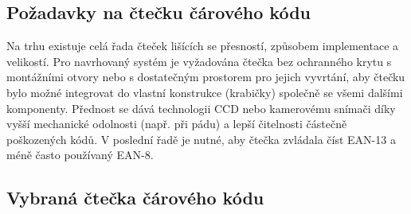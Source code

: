 \subsection{Požadavky na čtečku čárového kódu}
Na trhu existuje celá řada čteček lišících se přesností, způsobem implementace a velikostí. Pro navrhovaný systém je vyžadována čtečka bez ochranného krytu s montážními otvory nebo s dostatečným prostorem pro jejich vyvrtání, aby čtečku bylo možné integrovat do vlastní konstrukce (krabičky) společně se všemi dalšími komponenty. Přednost se dává technologii CCD nebo kamerovému snímači díky vyšší mechanické odolnosti (např. při pádu) a lepší čitelnosti částečně poškozených kódů.
V poslední řadě je nutné, aby čtečka zvládala číst EAN-13 a méně často používaný EAN-8.






\subsection{Vybraná čtečka čárového kódu}


